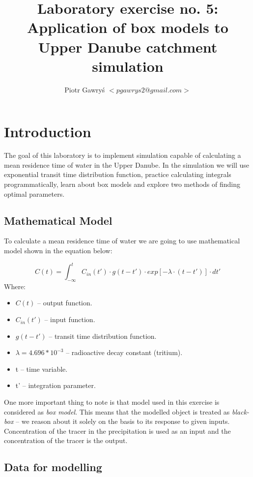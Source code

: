 \documentclass[12pt]{article}
\title{Laboratory exercise no. 5: Application of box models to Upper Danube catchment simulation}
\author{Piotr Gawry\'s $<pgawrys2@gmail.com>$}
\begin{document}
\maketitle

\section{Introduction}
The goal of this laboratory is to implement simulation capable of calculating a mean residence time of water in the Upper Danube. In the simulation we will use exponential transit time distribution function, practice calculating integrals programmatically, learn about box models and explore two methods of finding optimal parameters.

\subsection{Mathematical Model}

To calculate a mean residence time of water we are going to use mathematical model shown in the equation below:

\begin{equation} \label{eq:1}
C(t) = \int_{- \infty}^{t} C_{in}(t') \cdot g(t - t') \cdot exp[-\lambda \cdot (t - t')] \cdot dt'
\end{equation}
Where:
\begin{itemize}
	\item $C(t)$ -- output function.
	\item $C_{in}(t')$ -- input function.
	\item $g(t - t')$ -- transit time distribution function.
	\item $\lambda = 4.696 * 10^{-3}$ -- radioactive decay constant (tritium).
	\item t -- time variable.
	\item t' -- integration parameter.
\end{itemize}

One more important thing to note is that model used in this exercise is considered as \textit{box model}. This means that the modelled object is treated as \textit{black-box} -- we reason about it solely on the basis to its response to given inputs. Concentration of the tracer in the precipitation is used as an input and the concentration of the tracer is the output.

\subsection{Data for modelling}
\end{document}

